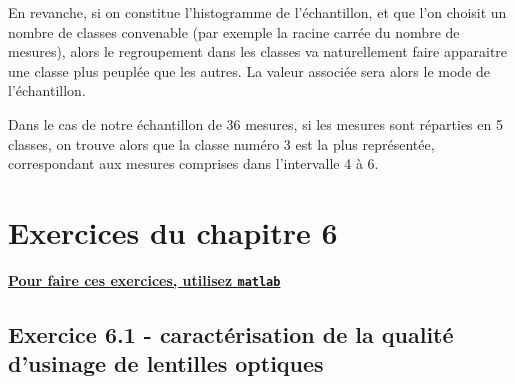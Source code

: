 En revanche, si on constitue l'histogramme de l'échantillon, et que l'on choisit un nombre de classes convenable (par exemple la racine carrée du nombre de mesures), alors le regroupement dans les classes va naturellement faire apparaitre une classe plus peuplée que les autres. La valeur associée sera alors le mode de l'échantillon.

Dans le cas de notre échantillon de 36 mesures, si les mesures sont réparties en 5 classes, on trouve alors que la classe numéro 3 est la plus représentée, correspondant aux mesures comprises dans l'intervalle 4 à 6.

\section{Exercices du chapitre 6}

\begin{center}
    \Large \bf {\underline{Pour faire ces exercices, utilisez \texttt{matlab}}}
\end{center}

\subsection*{Exercice 6.1 - caractérisation de la qualité d'usinage de lentilles optiques}

